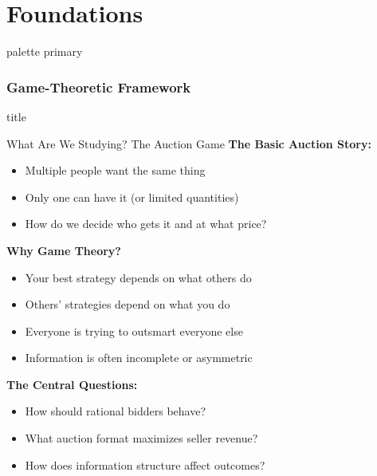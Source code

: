 \documentclass[xcolor={x11names}, aspectratio=169 ]{beamer}
\newcommand{\sectionslide}{%
  \begin{frame}
    \vfill
    \centering
    \begin{beamercolorbox}[sep=8pt,center,shadow=true,rounded=true]{title}
      \usebeamerfont{title}\insertsectionhead\par%
    \end{beamercolorbox}
    \vfill
  \end{frame}
}
\newcommand{\partslide}{%
  \begin{frame}
    \vfill
    \centering
    \begin{beamercolorbox}[sep=12pt,center,shadow=true,rounded=true]{palette primary}
      \usebeamerfont{title}\Large\insertpart\par%
    \end{beamercolorbox}
    \vfill
  \end{frame}
}
\begin{document}
\part{Foundations}
\partslide
\section{Game-Theoretic Framework}
\sectionslide

\begin{frame}{What Are We Studying? The Auction Game}
\textbf{The Basic Auction Story:}
\begin{itemize}
  \item Multiple people want the same thing
  \item Only one can have it (or limited quantities)
  \item How do we decide who gets it and at what price?
\end{itemize}

\vspace{0.3cm}
\textbf{Why Game Theory?}
\begin{itemize}
  \item Your best strategy depends on what others do
  \item Others' strategies depend on what you do
  \item Everyone is trying to outsmart everyone else
  \item Information is often incomplete or asymmetric
\end{itemize}

\vspace{0.3cm}
\textbf{The Central Questions:}
\begin{itemize}
  \item How should rational bidders behave?
  \item What auction format maximizes seller revenue?
  \item How does information structure affect outcomes?
\end{itemize}
\end{frame}
\end{document}
